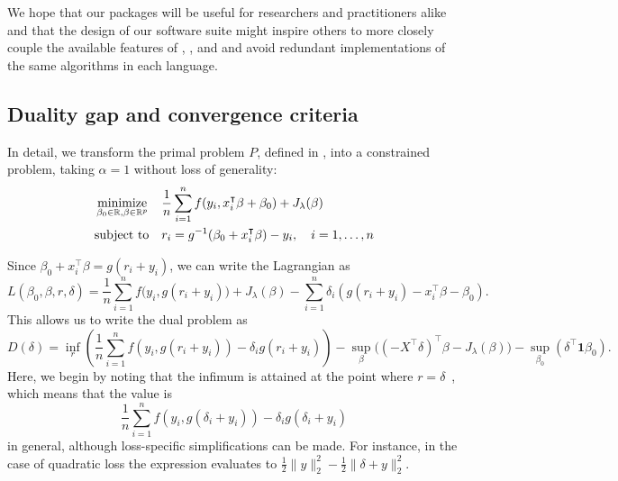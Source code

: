 \documentclass[article]{jss}
\let\Cref\crtCref
\begin{document}
We hope that our packages will be useful for researchers and
practitioners alike and that the design of our software suite
might inspire others to more closely couple the available features
of , , and  and avoid
redundant implementations of the same algorithms in each language.



\newpage

\begin{appendix}

  \section{Duality gap and convergence criteria}
  \label{sec:convergence-criteria-details}

  In detail, we transform the primal problem \(P\), defined in \Cref{eq:slope}, into a
  constrained problem, taking \(\alpha = 1\) without loss of generality:
  \begin{equation}
    \label{eq:slope-constrained}
    \begin{aligned}
       & \operatorname*{minimize}_{\beta_0 \in \mathbb{R},\beta \in \mathbb{R}^p} &  & \frac{1}{n} \sum_{i=1}^n f(y_i, x_i^\intercal \beta + \beta_0) + J_{\lambda}(\beta) \\
       & \text{subject to}                                         &  & r_i = g^{-1}(\beta_0 + x_i^\intercal \beta) - y_i, \quad i = 1, \ldots, n           \\
    \end{aligned}
  \end{equation}

  Since \(\beta_0 + x_i^\intercal \beta = g(r_i + y_i)\), we can write the Lagrangian as
  \[
    L(\beta_0,\beta,r,\delta) = \frac{1}{n} \sum_{i=1}^n f\big(y_i, g(r_i + y_i)\big) + J_{\lambda}(\beta) - \sum_{i=1}^n \delta_i \left(g(r_i + y_i) - x_i^\intercal \beta - \beta_0 \right).
  \]
  This allows us to write the dual problem as
  \[
    D(\delta)  = \inf_r\left( \frac{1}{n} \sum_{i=1}^n f\left(y_i, g(r_i+y_i)\right) - \delta_i g(r_i+ y_i)\right)
    - \sup_\beta \big((-X^\intercal \delta)^\intercal \beta -  J_\lambda(\beta) \big)
    - \sup_{\beta_0} \left( \delta^\intercal \bm{1} \beta_0\right).
  \]
  Here, we begin by noting that the infimum is attained at the point where
  \(r = \delta\)~\citep{fercoq2015}, which means that the value is
  \[
    \frac{1}{n} \sum_{i=1}^n f\left(y_i, g(\delta_i+y_i)\right) - \delta_i g(\delta_i + y_i)
  \]
  in general, although loss-specific simplifications can be made. For instance, in the case of
  quadratic loss the expression evaluates to \(\frac{1}{2} \lVert y \rVert_2^2 - \frac{1}{2} \lVert \delta + y \lVert^2_2 \).


\end{appendix}
\end{document}
